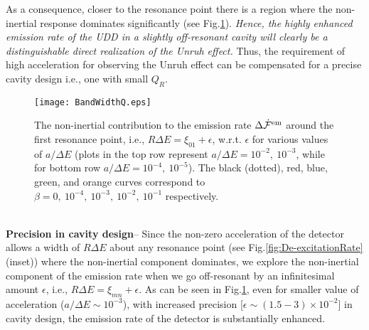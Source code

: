 \documentclass[aps,prl,nofootinbib,preprintnumbers,floatfix,twocolumn,superscriptaddress]{revtex4}
\begin{document}
As a consequence, closer to the resonance point there is a 
region where the non-inertial response dominates significantly 
(see Fig.\ref{fig:BandWidth}).
{\it Hence, the highly enhanced emission rate of the UDD in a 
slightly off-resonant cavity will clearly be a distinguishable direct realization 
of the Unruh effect.} Thus, the requirement of high acceleration for observing the 
Unruh effect can be compensated for a precise cavity design 
i.e., one with small $Q_R$.
\begin{figure}[!htb]
\begin{center}
\texttt{[image: BandWidthQ.eps]} 
\caption{The non-inertial contribution to the emission rate $\Delta {\dot {\cal F}}^{\rm em}$ 
around the first resonance point, 
i.e., $R\Delta E=\xi_{01}+\epsilon$, w.r.t. $\epsilon$ for various values of $a/\Delta E$ 
(plots in the top row represent $a/\Delta E=10^{-2},~10^{-3}$, while for bottom row 
$a/\Delta E=10^{-4},~10^{-5}$). 
The black (dotted), red, blue, green, and orange curves correspond to 
$\beta=0,~10^{-4},~10^{-3},~10^{-2},~10^{-1}$ respectively.}
\label{fig:BandWidth}
\end{center}
\end{figure}
\\ 
{\bf Precision in cavity design}-- 
Since the non-zero acceleration of the detector allows a width of $R\Delta E$ about 
any resonance point (see Fig.\ref{fig:De-excitationRate} (inset)) where the 
non-inertial component dominates, we explore the non-inertial component of the 
emission rate when we go off-resonant by an infinitesimal amount $\epsilon$, 
i.e., $R\Delta E=\xi_{mn}+\epsilon$. As can be seen in Fig.\ref{fig:BandWidth}, even 
for smaller value of acceleration ($ a/\Delta E \sim 10^{-3}$), with increased
precision [$\epsilon \sim (1.5 - 3) \times 10^{-2}$] in cavity design, the emission 
rate of the detector is substantially enhanced. 
\end{document}
